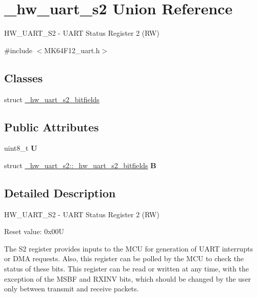 \hypertarget{union__hw__uart__s2}{}\section{\+\_\+hw\+\_\+uart\+\_\+s2 Union Reference}
\label{union__hw__uart__s2}


H\+W\+\_\+\+U\+A\+R\+T\+\_\+\+S2 -\/ U\+A\+RT Status Register 2 (RW)  




{\ttfamily \#include $<$M\+K64\+F12\+\_\+uart.\+h$>$}

\subsection*{Classes}
\begin{DoxyCompactItemize}
\item 
struct \hyperlink{struct__hw__uart__s2_1_1__hw__uart__s2__bitfields}{\+\_\+hw\+\_\+uart\+\_\+s2\+\_\+bitfields}
\end{DoxyCompactItemize}
\subsection*{Public Attributes}
\begin{DoxyCompactItemize}
\item 
uint8\+\_\+t {\bfseries U}\hypertarget{union__hw__uart__s2_ac647a195e92c0b6ee7d37da50a9088ae}{}\label{union__hw__uart__s2_ac647a195e92c0b6ee7d37da50a9088ae}

\item 
struct \hyperlink{struct__hw__uart__s2_1_1__hw__uart__s2__bitfields}{\+\_\+hw\+\_\+uart\+\_\+s2\+::\+\_\+hw\+\_\+uart\+\_\+s2\+\_\+bitfields} {\bfseries B}\hypertarget{union__hw__uart__s2_aeb2249d92949e19a659679baf2b5449b}{}\label{union__hw__uart__s2_aeb2249d92949e19a659679baf2b5449b}

\end{DoxyCompactItemize}


\subsection{Detailed Description}
H\+W\+\_\+\+U\+A\+R\+T\+\_\+\+S2 -\/ U\+A\+RT Status Register 2 (RW) 

Reset value\+: 0x00U

The S2 register provides inputs to the M\+CU for generation of U\+A\+RT interrupts or D\+MA requests. Also, this register can be polled by the M\+CU to check the status of these bits. This register can be read or written at any time, with the exception of the M\+S\+BF and R\+X\+I\+NV bits, which should be changed by the user only between transmit and receive packets. 

